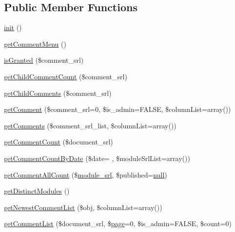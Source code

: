 \subsection*{Public Member Functions}
\begin{DoxyCompactItemize}
\item 
\hyperlink{classcommentModel_a4da59f10ea425e61dbd5bebe73ab9ec1}{init} ()
\item 
\hyperlink{classcommentModel_a74e52809b658711e8d63ba7900eb5246}{get\+Comment\+Menu} ()
\item 
\hyperlink{classcommentModel_aff0bb9049c29d3795fbe2c7eb92a2451}{is\+Granted} (\$comment\+\_\+srl)
\item 
\hyperlink{classcommentModel_adfb890eecf72a039c9f7a28c1e6eb3d2}{get\+Child\+Comment\+Count} (\$comment\+\_\+srl)
\item 
\hyperlink{classcommentModel_ac1acb7d6d8da68e20ec5e6e5a55e5d32}{get\+Child\+Comments} (\$comment\+\_\+srl)
\item 
\hyperlink{classcommentModel_adc900f3123da26b591a20ca7a951e4ac}{get\+Comment} (\$comment\+\_\+srl=0, \$is\+\_\+admin=F\+A\+L\+SE, \$column\+List=array())
\item 
\hyperlink{classcommentModel_a435e77a0e774c5b6ba899312e8bea2dd}{get\+Comments} (\$comment\+\_\+srl\+\_\+list, \$column\+List=array())
\item 
\hyperlink{classcommentModel_af28e4e312fad244148fd96bd0e8f0b5f}{get\+Comment\+Count} (\$document\+\_\+srl)
\item 
\hyperlink{classcommentModel_a29b3a6403c25f503f3fb91b4329542ee}{get\+Comment\+Count\+By\+Date} (\$date= \textquotesingle{}\textquotesingle{}, \$module\+Srl\+List=array())
\item 
\hyperlink{classcommentModel_a6d868da113e98ecde6c6e5cb12ce4cbf}{get\+Comment\+All\+Count} (\$\hyperlink{ko_8install_8php_a370bb6450fab1da3e0ed9f484a38b761}{module\+\_\+srl}, \$published=\hyperlink{modernizr_8min_8js_a286f9ec831c5e676eeb493248eab9575}{null})
\item 
\hyperlink{classcommentModel_a4f202e4238ab75645a10db6acaa1f969}{get\+Distinct\+Modules} ()
\item 
\hyperlink{classcommentModel_a89492b8f475e42296e1560b8886bdc01}{get\+Newest\+Comment\+List} (\$obj, \$column\+List=array())
\item 
\hyperlink{classcommentModel_ae43f36bfd32d39f87dac358aa1526f7f}{get\+Comment\+List} (\$document\+\_\+srl, \$\hyperlink{classpage}{page}=0, \$is\+\_\+admin=F\+A\+L\+SE, \$count=0)
\item 

\end{DoxyCompactItemize}
